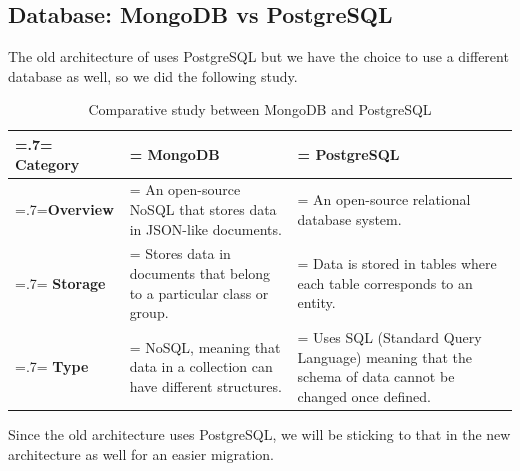 \subsection{Database: MongoDB vs PostgreSQL}
The old architecture of  uses PostgreSQL but we have the choice to use a different database as well, so we did the following study.
\begin{table}[H]
    \renewcommand{\arraystretch}{1.5}%
    \caption{Comparative study between MongoDB and PostgreSQL}
    \centering
    \medskip
    \begin{tabularx}{1\textwidth} {
            | >{\hsize=.7\hsize\linewidth=\hsize\centering\arraybackslash}X
            | >{\hsize=1.15\hsize\linewidth=\hsize\justifying\arraybackslash}X
            | >{\hsize=1.15\hsize\linewidth=\hsize\justifying\arraybackslash}X |}
        \hline
        \rowcolor{primary} \textbf {Category} & \textbf {MongoDB}                                                                 & \textbf {PostgreSQL}                                                                                         \\
        \hline
        \textbf {Overview}                    & \noindent An open-source NoSQL that stores data in JSON-like documents.           & \noindent An open-source relational database system.                                                         \\
        \hline
        \textbf {Storage}                     & \noindent Stores data in documents that belong to a particular class or group.    & \noindent Data is stored in tables where each table corresponds to an entity.                                \\
        \hline
        \textbf {Type}                        & \noindent NoSQL, meaning that data in a collection can have different structures. & \noindent Uses SQL (Standard Query Language) meaning that the schema of data cannot be changed once defined. \\
        \hline
    \end{tabularx}
\end{table}
Since the old architecture uses PostgreSQL, we will be sticking to that in the new architecture as well for an easier migration.

